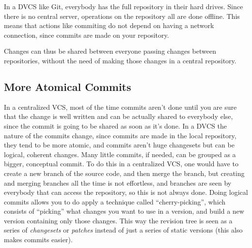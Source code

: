 \documentclass[%
	final,
	notitlepage,
	narroweqnarray,
	inline,
	twoside,
	]{ieee}
\begin{document}
In a DVCS like Git, everybody has the full repository in their hard drives.
Since there is no central server, operations on the repository all are done 
offline. This means that actions like commiting do not depend on having a 
network connection, since commits are made on your repository.

Changes can thus be shared between everyone passing changes between repositories, 
without the need of making those changes in a central repository.



\subsection{More Atomical Commits}

In a centralized VCS, most of the time commits aren't done until you are sure that 
the change is well written and can be actually shared to everybody else, since the 
commit is going to be shared as soon as it's done. In a DVCS the nature of the commits 
change, since commits are made in the local repository, they tend to be more atomic, 
and commits aren't huge changesets but can be logical, coherent changes. 
Many little commits, if needed, can be grouped as a bigger, conceptual commit.
To do this in a centralized VCS, one would have to create a new branch of the source code, 
and then merge the branch, but creating and merging branches all the time is 
not effortless, and branches are seen by everybody that can access the repository, 
so this is not always done.
Doing logical commits allows you to do apply a technique called ``cherry-picking'', 
which consists of ``picking'' what changes you want to use in a version, and build 
a new version containing only those changes. This way the revision tree is seen as a 
series of \emph{changesets} or \emph{patches} instead of just a series of static versions
(this also makes commits easier).


\end{document}
